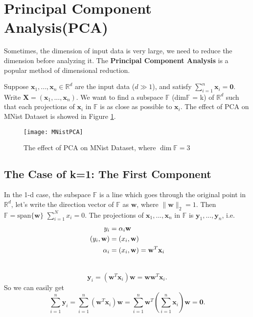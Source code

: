 \section{Principal Component Analysis(PCA)}
	Sometimes, the dimension of input data is very large, we need to reduce the dimension before analyzing it. The \textbf{Principal Component Analysis} is a popular method of dimensional reduction.
	
	Suppose $\mathbf x_1,...,\mathbf x_n\in\mathbb R^d$ are the input data ($d\gg 1$), and satisfy $\sum_{i=1}^{n}\mathbf x_i=\mathbf 0$. Write $\mathbf X = (\mathbf x_1,...,\mathbf x_n)$. We want to find a subspace $\mathbb F$ (dim$\mathbb F$ = k) of $\mathbb{R}^d$ such that each projections of $\mathbf x_i$ in $\mathbb F$ is as close as possible to $\mathbf x_i$. The effect of PCA on MNist Dataset is showed in Figure \ref{fig:mnistpca}.
	
	\begin{figure}[h]
		\centering
		\texttt{[image: MNistPCA]}
		\caption{The effect of PCA on MNist Dataset, where $\dim \mathbb F=3$}
		\label{fig:mnistpca}
	\end{figure}

\subsection{The Case of k=1: The First Component}


	In the 1-d case, the subspace $\mathbb F$ is a line which goes through the original point in $\mathbb R^d$, let's write the direction vector of $\mathbb F$ as $\mathbf w$, where $\|\mathbf w\|_2=1$. Then $\mathbb F=\text{span}\{\mathbf w\}$ $\sum_{i=1}^N x_i=0$. The projections of $\mathbf x_1,...,\mathbf x_n$ in $\mathbb F$ is $\mathbf y_1,...,\mathbf y_n$, i.e.
	\begin{align}
	y_i&=\alpha_i \mathbf w \\\notag
	(y_i,\mathbf w)&=(x_i ,\mathbf w) \\\notag
	\alpha_i &=(x_i ,\mathbf w)=\mathbf w^T\mathbf x_i \\\notag
	\end{align}

	 $$\mathbf y_i=(\mathbf w^T\mathbf x_i)\mathbf w=\mathbf w \mathbf w^T\mathbf x_i.$$
	  So we can easily get 
	$$\sum_{i=1}^{n}\mathbf y_i=\sum_{i=1}^{n}(\mathbf w^T\mathbf x_i)\mathbf w=\sum_{i=1}^{n}\mathbf w^T(\sum_{i=1}^{n}\mathbf x_i)\mathbf w=\bm 0.$$

